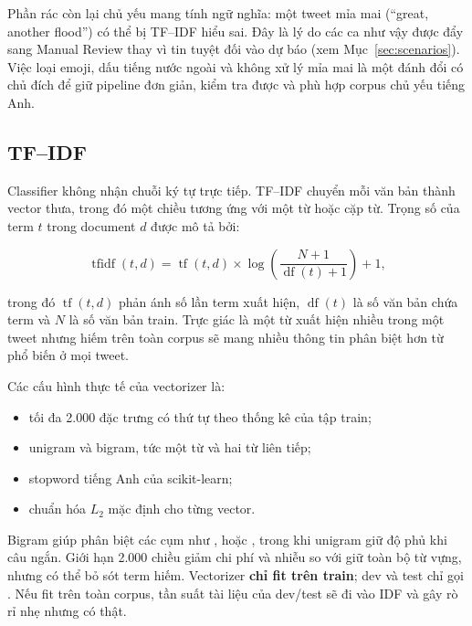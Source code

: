 Phần rác còn lại chủ yếu mang tính ngữ nghĩa: một tweet mỉa mai
(``great, another flood'') có thể bị TF--IDF hiểu sai. Đây là lý do các ca như
vậy được đẩy sang Manual Review thay vì tin tuyệt đối vào dự báo (xem
Mục~\ref{sec:scenarios}). Việc loại emoji, dấu tiếng nước ngoài và không xử lý
mỉa mai là một đánh đổi có chủ đích để giữ pipeline đơn giản, kiểm tra được và
phù hợp corpus chủ yếu tiếng Anh.

\subsection{TF--IDF}

Classifier không nhận chuỗi ký tự trực tiếp. TF--IDF chuyển mỗi văn bản thành
vector thưa, trong đó một chiều tương ứng với một từ hoặc cặp từ. Trọng số của
term \(t\) trong document \(d\) được mô tả bởi:

\[
\operatorname{tfidf}(t,d)
=\operatorname{tf}(t,d)\times
\log\left(\frac{N+1}{\operatorname{df}(t)+1}\right)+1,
\]

trong đó \(\operatorname{tf}(t,d)\) phản ánh số lần term xuất hiện,
\(\operatorname{df}(t)\) là số văn bản chứa term và \(N\) là số văn bản train.
Trực giác là một từ xuất hiện nhiều trong một tweet nhưng hiếm trên toàn corpus
sẽ mang nhiều thông tin phân biệt hơn từ phổ biến ở mọi tweet.

Các cấu hình thực tế của vectorizer là:

\begin{itemize}[leftmargin=*]
  \item tối đa 2.000 đặc trưng có thứ tự theo thống kê của tập train;
  \item unigram và bigram, tức một từ và hai từ liên tiếp;
  \item stopword tiếng Anh của scikit-learn;
  \item chuẩn hóa \(L_2\) mặc định cho từng vector.
\end{itemize}

Bigram giúp phân biệt các cụm như , 
hoặc , trong khi unigram giữ độ phủ khi câu ngắn. Giới hạn
2.000 chiều giảm chi phí và nhiễu so với giữ toàn bộ từ vựng, nhưng có thể bỏ
sót term hiếm. Vectorizer \textbf{chỉ fit trên train}; dev và test chỉ gọi
. Nếu fit trên toàn corpus, tần suất tài liệu của dev/test sẽ
đi vào IDF và gây rò rỉ nhẹ nhưng có thật.

